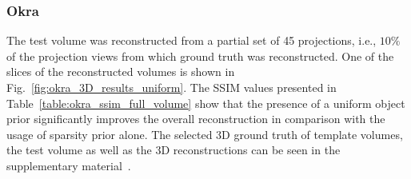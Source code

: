 \documentclass[journal]{IEEEtran}
\begin{document}
\subsubsection{\textbf{Okra}}
\label{Sec:okra_uniform}
The test volume was reconstructed from a partial set of
45 projections, i.e., $10\%$ of the projection views from which ground
truth was reconstructed.
 One of the slices of the reconstructed volumes is shown in
 Fig.~\ref{fig:okra_3D_results_uniform}. The SSIM values presented in
 Table~\ref{table:okra_ssim_full_volume} show that the presence of a
 uniform object prior significantly improves the overall
 reconstruction in comparison with the usage of sparsity prior alone.
 The selected 3D ground truth of template volumes, the test volume as
 well as the 3D reconstructions can be seen in the supplementary
 material~\cite{supp_paper}.
\end{document}
